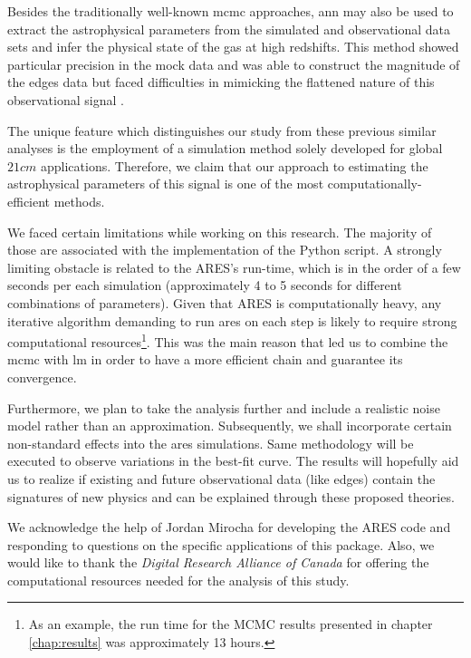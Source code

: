 \documentclass[%
 reprint,
 amsmath,amssymb,
 aps,
]{revtex4-2}
\begin{document}
Besides the traditionally well-known \gls{mcmc} approaches, \gls{ann} may also be used to extract the astrophysical parameters from the simulated and observational data sets and infer the physical state of the gas at high redshifts. This method showed particular precision in the mock data and was able to construct the magnitude of the \gls{edges} data but faced difficulties in mimicking the flattened nature of this observational signal \cite{pe_nn_1}.\par

The unique feature which distinguishes our study from these previous similar analyses is the employment of a simulation method solely developed for global $21cm$ applications. Therefore, we claim that our approach to estimating the astrophysical parameters of this signal is one of the most computationally-efficient methods.\par
We faced certain limitations while working on this research. The majority of those are associated with the implementation of the Python script. 
A strongly limiting obstacle is related to the ARES's run-time, which is in the order of a few seconds per each simulation (approximately 4 to 5 seconds for different combinations of parameters). Given that ARES is computationally heavy, any iterative algorithm demanding to run \gls{ares} on each step is likely to require strong computational resources\footnote{ As an example, the run time for the MCMC results presented in chapter \ref{chap:results} was approximately 13 hours.}. This was the main reason that led us to combine the \gls{mcmc} with \gls{lm} in order to have a more efficient chain and guarantee its convergence.\par 
Furthermore, we plan to take the analysis further and include a realistic noise model rather than an approximation. Subsequently, we shall incorporate certain non-standard effects into the \gls{ares} simulations. Same methodology will be executed to observe variations in the best-fit curve. 
The results will hopefully aid us to realize if existing and future observational data (like \gls{edges})
contain the signatures of new physics and can be explained through these proposed theories.\par

\begin{acknowledgements}
     We acknowledge the help of Jordan Mirocha for developing the ARES code and responding to questions on the specific applications of this package. Also, we would like to thank the \emph{Digital Research Alliance of Canada} for offering the computational resources needed for the analysis of this study.
\end{acknowledgements}
\end{document}
